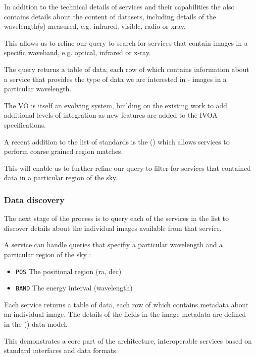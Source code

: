 \documentclass{article}
\begin{document}
In addition to the technical details of services and their capabilities the
\cite{ivoa.reg} also contains details about the content of datasets, including
details of the wavelength(s) measured, e.g. infrared, visible, radio or xray.

This allows us to refine our query to search for \cite{ivoa.sia} services that
contain images in a specific waveband, e.g. optical, infrared or x-ray.

The \cite{ivoa.reg} query returns a table of data, each row of which contains
information about a \cite{ivoa.sia} service that provides the type of data we are
interested in - images in a particular wavelength.


The VO is itself an evolving system, building on the existing work to add
additional levels of integration as new features are added to the IVOA
specifications.

A recent addition to the list of \cite{ivoa} standards is the
 (\cite{ivoa.moc})
which allows \cite{ivoa.reg} services to perform coarse grained region matches.

This will enable us to further refine our \cite{ivoa.reg} query to filter for
\cite{ivoa.sia} services that contained data in a particular
region of the sky.

\subsubsection{Data discovery}

The next stage of the process is to query each of the \cite{ivoa.sia} services
in the list to discover details about the individual images available from that
service.

\noindent
A \cite{ivoa.sia} service can handle queries that specifiy a particular wavelength
and a particular region of the sky :
\begin{itemize}
  \item \texttt{POS}  The positional region (ra, dec)
  \item \texttt{BAND} The energy interval (wavelength)
\end{itemize}

Each \cite{ivoa.sia} service returns a table of data, each row of which
contains metadata about an individual image. The details of the fields in the
image metadata are defined in the
 (\cite{ivoa.obscore})
data model.

This demonstrates a core part of the \cite{ivoa} architecture, interoperable services
based on standard interfaces and data formats.
\end{document}
